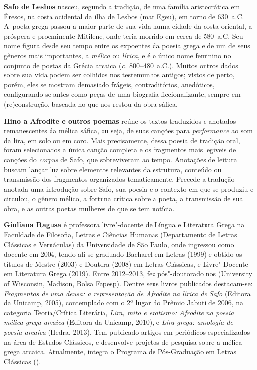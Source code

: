 \textbf{Safo de Lesbos} nasceu, segundo a tradição, de uma família 
aristocrática em Êresos, na costa ocidental da ilha de Lesbos
(mar Egeu), em torno de 630~a.C. A~poeta grega passou a maior parte de
sua vida numa cidade da costa oriental, a próspera e proeminente Mitilene, onde
teria morrido em cerca de 580~a.C. Seu nome figura desde seu tempo entre os
expoentes da poesia grega e de um de seus gêneros mais importantes, a
\textit{mélica} ou \textit{lírica}, e é o único nome feminino no conjunto de
poetas da Grécia arcaica (\textit{c.} 800–480~a.C.). Muitos outros dados sobre
sua vida podem ser colhidos nos testemunhos antigos; vistos de perto, porém,
eles se mostram demasiado frágeis, contraditórios, anedóticos, configurando-se
antes como peças de uma biografia ficcionalizante, sempre em (re)construção,
baseada no que nos restou da obra sáfica.

\textbf{Hino a Afrodite e outros poemas} reúne os textos traduzidos e anotados 
remanescentes da mélica sáfica, ou seja, de suas canções para \textit{performance} 
ao som da lira, em solo ou em coro. Mais precisamente, dessa poesia de
tradição oral, foram selecionados a única canção completa e os fragmentos mais legíveis  
de canções do \textit{corpus} de Safo, que sobreviveram ao tempo. 
Anotações de leitura buscam lançar luz sobre elementos
relevantes da estrutura, conteúdo ou transmissão dos fragmentos organizados
tematicamente. Precede a tradução anotada uma introdução sobre Safo, sua poesia
e o contexto em que se produziu e circulou, o gênero mélico, a fortuna crítica
sobre a poeta, a transmissão de sua obra, e as outras poetas mulheres de que
se tem notícia. 

\textbf{Giuliana Ragusa} é professora livre"-docente de Língua e Literatura Grega na Faculdade de Filosofia, Letras e Ciências Humanas (Departamento de Letras Clássicas e Vernáculas) da Universidade de São Paulo, onde ingressou como docente em 2004, tendo ali se graduado Bacharel em Letras (1999) e obtido os títulos de Mestre (2003) e Doutora (2008) em Letras Clássicas, e Livre"-Docente em Literatura Grega (2019). Entre 2012--2013, fez pós"-doutorado nos  (University of Wisconsin, Madison, Bolsa Fapesp). Dentre seus livros publicados destacam-se: 
\textit{Fragmentos de uma deusa: a representação de Afrodite
na lírica de Safo} (Editora da Unicamp, 2005), contemplado com o 2º lugar do 
Prêmio Jabuti de 2006, na categoria Teoria/Crítica Literária,
\textit{Lira, mito e erotismo: Afrodite na poesia mélica grega arcaica} 
(Editora da Unicamp, 2010), e \emph{Lira grega: antologia de poesia arcaica} (Hedra, 2013). 
Tem publicado artigos em periódicos especializados na
área de Estudos Clássicos, e desenvolve projetos de pesquisa sobre a mélica grega arcaica. Atualmente, integra o Programa de Pós-Graduação em Letras Clássicas ().





